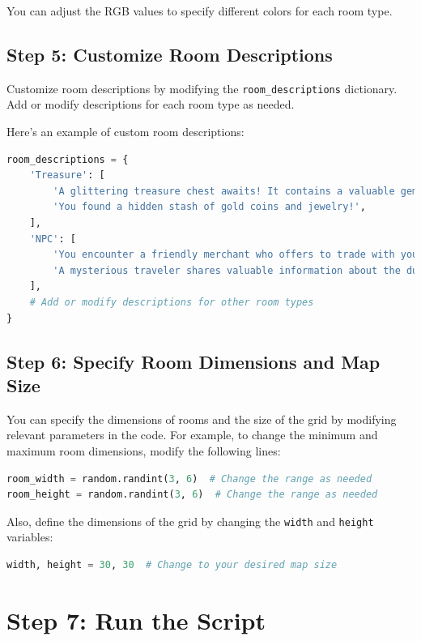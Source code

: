 \documentclass[10pt,twocolumn]{article}
\begin{document}
You can adjust the RGB values to specify different colors for each room type.

\subsection{Step 5: Customize Room Descriptions}

Customize room descriptions by modifying the \texttt{room\_descriptions} dictionary. Add or modify descriptions for each room type as needed.

Here's an example of custom room descriptions:

\begin{lstlisting}[language=Python]
room_descriptions = {
    'Treasure': [
        'A glittering treasure chest awaits! It contains a valuable gem.',
        'You found a hidden stash of gold coins and jewelry!',
    ],
    'NPC': [
        'You encounter a friendly merchant who offers to trade with you.',
        'A mysterious traveler shares valuable information about the dungeon.',
    ],
    # Add or modify descriptions for other room types
}
\end{lstlisting}

\subsection{Step 6: Specify Room Dimensions and Map Size}

You can specify the dimensions of rooms and the size of the grid by modifying relevant parameters in the code. For example, to change the minimum and maximum room dimensions, modify the following lines:

\begin{lstlisting}[language=Python]
room_width = random.randint(3, 6)  # Change the range as needed
room_height = random.randint(3, 6)  # Change the range as needed
\end{lstlisting}

Also, define the dimensions of the grid by changing the \texttt{width} and \texttt{height} variables:

\begin{lstlisting}[language=Python]
width, height = 30, 30  # Change to your desired map size
\end{lstlisting}

\section{Step 7: Run the Script}
\end{document}
